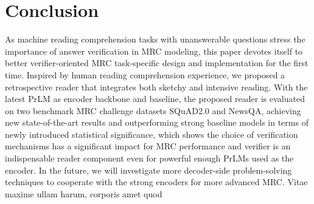 \documentclass[letterpaper]{article} %
\begin{document}
\section{Conclusion}
As machine reading comprehension tasks with unanswerable questions stress the importance of answer verification in MRC modeling, this paper devotes itself to better verifier-oriented MRC task-specific design and implementation for the first time. Inspired by human reading comprehension experience, we proposed a retrospective reader that integrates both sketchy and intensive reading. With the latest PrLM as encoder backbone and baseline, the proposed reader is evaluated on two benchmark MRC challenge datasets SQuAD2.0 and NewsQA, achieving new state-of-the-art results and outperforming strong baseline models in terms of newly introduced statistical significance, which shows the choice of verification mechanisms has a significant impact for MRC performance and verifier is an indispensable reader component even for powerful enough PrLMs used as the encoder. In the future, we will investigate more decoder-side problem-solving techniques to cooperate with the strong encoders for more advanced MRC.  Vitae maxime ullam harum, corporis amet quod

\end{document}

